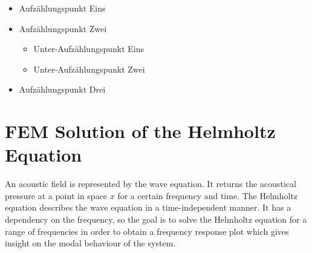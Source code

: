 \documentclass[%
  a4paper,oneside,%
  11pt,%
  smallchapters,
  green,%
  rgb, <cmyk>
  ]{tubsbook}
\begin{document}
\lipsum[1]

\begin{itemize}
  \item Aufzählungspunkt Eins
  \item Aufzählungspunkt Zwei
    \begin{itemize}
      \item Unter-Aufzählungspunkt Eins
      \item Unter-Aufzählungspunkt Zwei
    \end{itemize}
  \item Aufzählungspunkt Drei
\end{itemize}



\chapter{FEM Solution of the Helmholtz Equation}
An acoustic field is represented by the wave equation. It returns the acoustical pressure at a point in space $x$ for a certain frequency and time.
The Helmholtz equation describes the wave equation in a time-independent manner. It has a dependency on the frequency, so the goal is to solve the Helmholtz equation for a range of frequencies in order to obtain a frequency response plot which gives insight on the modal behaviour of the system.
\end{document}
